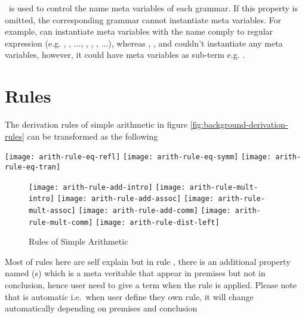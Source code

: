 \documentclass[master.tex]{subfiles}
\begin{document}
\kMetaVarRegex\ is used to control the name meta variables of each grammar. If
this property is omitted, the corresponding grammar cannot instantiate meta
variables. For example,  can instantiate meta variables with the name
comply to regular expression \pregex{\texttt{[a-z][0-9]*}} (e.g. , ,
$\ldots$, , , , $\ldots$), whereas ,
, and  couldn't instantiate any meta variables,
however, it could have meta variables as sub-term e.g. 
.

\section{Rules}

The derivation rules of simple arithmetic in figure \ref{fig:background-derivation-rules}
can be transformed as the following

\begin{center}
\begin{minipage}{0.6\textwidth}
    \texttt{[image: arith-rule-eq-refl]}
    \texttt{[image: arith-rule-eq-symm]}
    \texttt{[image: arith-rule-eq-tran]}
\end{minipage}
\end{center}

\begin{figure}[H]
    \centering
\begin{minipage}{0.6\textwidth}
    \texttt{[image: arith-rule-add-intro]}
    \texttt{[image: arith-rule-mult-intro]}
    \texttt{[image: arith-rule-add-assoc]}
    \texttt{[image: arith-rule-mult-assoc]}
    \texttt{[image: arith-rule-add-comm]}
    \texttt{[image: arith-rule-mult-comm]}
    \texttt{[image: arith-rule-dist-left]}
\end{minipage}
    \caption{Rules of Simple Arithmetic}
\label{fig:arith-rules}
\end{figure}

Most of rules here are self explain but in rule , there is an
additional property named \kParameter{}(s) which is a meta veritable that appear
in premises but not in conclusion, hence user need to give a term when the rule
is applied. Please note that \kParameter{} is automatic i.e.\ when user define
they own rule, it will change automatically depending on premises and conclusion
\end{document}
